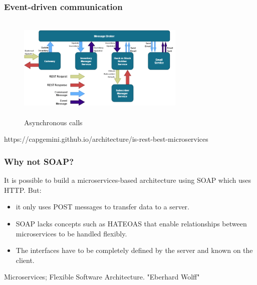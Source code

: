 \documentclass{beamer}
\begin{document}
	\begin{frame}
		\frametitle{Event-driven communication}
			\begin{figure}[h]
				\includegraphics[width=80mm, height=50mm, scale=2]{img/mq-flow.png}
				\caption{Asynchronous calls}
			\end{figure}
		
		\vspace{5mm}
		\tiny {https://capgemini.github.io/architecture/is-rest-best-microservices}
	\end{frame}

	\begin{frame}
		\frametitle{Why not SOAP?}
				It is possible to build a microservices-based architecture using SOAP which uses HTTP. But:
			
			\vspace{5mm}
			\begin{itemize}
				\item
					\scriptsize {it only uses POST messages to transfer data to a server}.
					
				\item 
					\scriptsize{SOAP lacks concepts such as HATEOAS that enable relationships between microservices to be handled flexibly}. 
				\item 
					\scriptsize{The interfaces have to be completely defined by the server and known on the client}.
			\end{itemize}
			
			\vspace{30mm}
			\tiny {Microservices; Flexible Software Architecture. "Eberhard Wolff"}
	\end{frame}
\end{document}
